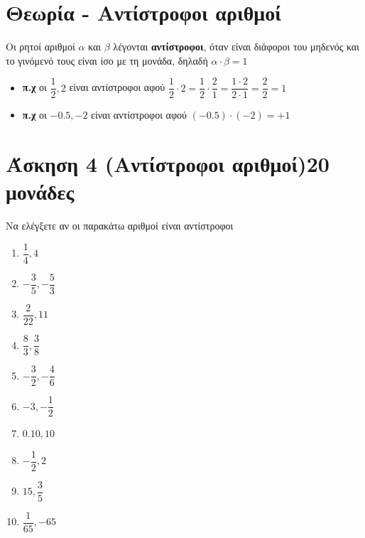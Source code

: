 \documentclass[a4paper,10pt]{report}
\begin{document}
\section*{Θεωρία - Αντίστροφοι αριθμοί \hfill \small{}}
Οι ρητοί αριθμοί $α$ και $β$ λέγονται \textbf{αντίστροφοι}, όταν είναι διάφοροι του μηδενός και το γινόμενό τους 
είναι ίσο με τη μονάδα, δηλαδή $α\cdot β=1$
\begin{itemize}
 \item \textbf{π.χ} οι $\dfrac{1}{2},2$ είναι αντίστροφοι αφού 
$\dfrac{1}{2}\cdot 2=\dfrac{1}{2}\cdot \dfrac{2}{1}=\dfrac{1\cdot2}{2\cdot1}=\dfrac{2}{2}=1$
 \item \textbf{π.χ} οι $-0.5,-2$ είναι αντίστροφοι αφού $(-0.5)\cdot(-2)=+1$
\end{itemize}

\section*{Άσκηση 4  (Αντίστροφοι αριθμοί)\hfill \small{20 μονάδες}}
Να ελέγξετε αν οι παρακάτω αριθμοί είναι αντίστροφοι
\begin{multicols}{2}
\begin{enumerate}[1)]
 \item $\dfrac{1}{4},4$
 \item $-\dfrac{3}{5},-\dfrac{5}{3}$
 \item $\dfrac{2}{22},11$
 \item $\dfrac{8}{3},\dfrac{3}{8}$
 \item $-\dfrac{3}{2},-\dfrac{4}{6}$
 \item $-3,-\dfrac{1}{2}$
 \item $0.10,10$
 \item $-\dfrac{1}{2},2$
 \item $15,\dfrac{3}{5}$
 \item $\dfrac{1}{65},-65$
\end{enumerate}
\end{multicols}
\end{document}
